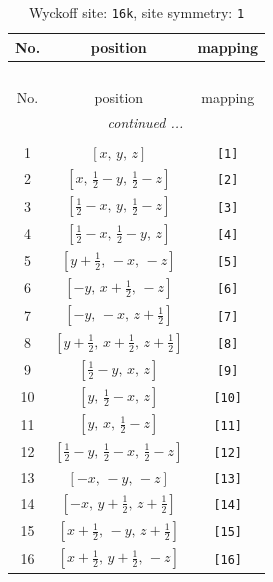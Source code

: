 \documentclass[fleqn,8pt]{jsarticle}
\begin{document}
\begin{longtable}{ccc}
\caption{Wyckoff site: {\tt 16k}, site symmetry: {\tt 1}}
 \\
 \hline \hline
No. & position & mapping \\ \hline \endfirsthead

\multicolumn{2}{l}{\tablename\ \thetable{}} \\
 \hline \hline
No. & position & mapping \\ \hline \endhead

 \hline \hline
\multicolumn{2}{r}{\footnotesize\it continued ...} \\ \endfoot

 \hline \hline
\multicolumn{2}{r}{} \\ \endlastfoot

1 & $\left[ x,\, y,\, z \right]$ & {\tt [1]} \\ \hline
2 & $\left[ x,\, \frac{1}{2} - y,\, \frac{1}{2} - z \right]$ & {\tt [2]} \\ \hline
3 & $\left[ \frac{1}{2} - x,\, y,\, \frac{1}{2} - z \right]$ & {\tt [3]} \\ \hline
4 & $\left[ \frac{1}{2} - x,\, \frac{1}{2} - y,\, z \right]$ & {\tt [4]} \\ \hline
5 & $\left[ y + \frac{1}{2},\, - x,\, - z \right]$ & {\tt [5]} \\ \hline
6 & $\left[ - y,\, x + \frac{1}{2},\, - z \right]$ & {\tt [6]} \\ \hline
7 & $\left[ - y,\, - x,\, z + \frac{1}{2} \right]$ & {\tt [7]} \\ \hline
8 & $\left[ y + \frac{1}{2},\, x + \frac{1}{2},\, z + \frac{1}{2} \right]$ & {\tt [8]} \\ \hline
9 & $\left[ \frac{1}{2} - y,\, x,\, z \right]$ & {\tt [9]} \\ \hline
10 & $\left[ y,\, \frac{1}{2} - x,\, z \right]$ & {\tt [10]} \\ \hline
11 & $\left[ y,\, x,\, \frac{1}{2} - z \right]$ & {\tt [11]} \\ \hline
12 & $\left[ \frac{1}{2} - y,\, \frac{1}{2} - x,\, \frac{1}{2} - z \right]$ & {\tt [12]} \\ \hline
13 & $\left[ - x,\, - y,\, - z \right]$ & {\tt [13]} \\ \hline
14 & $\left[ - x,\, y + \frac{1}{2},\, z + \frac{1}{2} \right]$ & {\tt [14]} \\ \hline
15 & $\left[ x + \frac{1}{2},\, - y,\, z + \frac{1}{2} \right]$ & {\tt [15]} \\ \hline
16 & $\left[ x + \frac{1}{2},\, y + \frac{1}{2},\, - z \right]$ & {\tt [16]} \\
\end{longtable}
\end{document}

